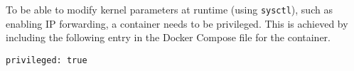 To be able to modify kernel parameters at runtime (using \texttt{sysctl}),
such as enabling IP forwarding, a container needs to be privileged.
This is achieved by including the following entry
in the Docker Compose file for the container.

\begin{lstlisting}
privileged: true
\end{lstlisting}

